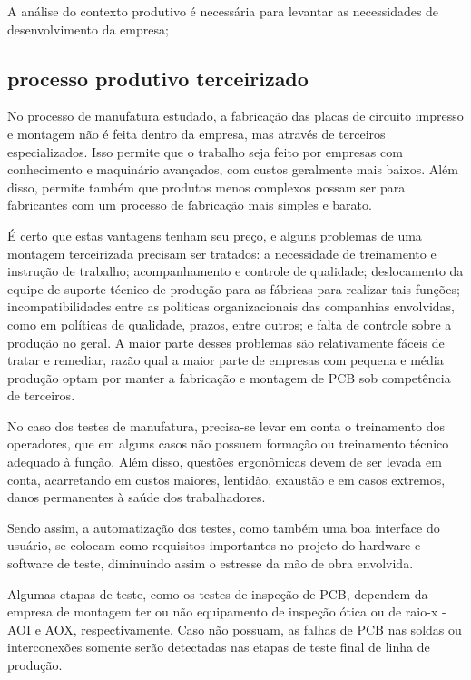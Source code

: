 
A análise do contexto produtivo é necessária para levantar as necessidades de desenvolvimento da empresa;

    \subsection{processo produtivo terceirizado}
        No processo de manufatura estudado, a fabricação das placas de circuito impresso e montagem não é feita dentro da empresa, mas através de terceiros especializados. Isso permite que o trabalho seja feito por empresas com conhecimento e maquinário avançados, com custos geralmente mais baixos. Além disso, permite também que produtos menos complexos possam ser para fabricantes com um processo de fabricação mais simples e barato.
        
        É certo que estas vantagens tenham seu preço, e alguns problemas de uma montagem terceirizada precisam ser tratados: a necessidade de treinamento e instrução de trabalho; acompanhamento e controle de qualidade; deslocamento da equipe de suporte técnico de produção para as fábricas para realizar tais funções; incompatibilidades entre as politicas organizacionais das companhias envolvidas, como em políticas de qualidade, prazos, entre outros; e falta de controle sobre a produção no geral. A maior parte desses problemas são relativamente fáceis de tratar e remediar, razão qual a maior parte de empresas com pequena e média produção optam por manter a fabricação e montagem de PCB sob competência de terceiros.
        
        No caso dos testes de manufatura, precisa-se levar em conta o treinamento dos operadores, que em alguns casos não possuem formação ou treinamento técnico adequado à função. Além disso, questões ergonômicas devem de ser levada em conta, acarretando em custos maiores, lentidão, exaustão e em casos extremos, danos permanentes à saúde dos trabalhadores. 
        
        Sendo assim, a automatização dos testes, como também uma boa interface do usuário, se colocam como requisitos importantes no projeto do hardware e software de teste, diminuindo assim o estresse da mão de obra envolvida. 
        
        Algumas etapas de teste, como os testes de inspeção de PCB, dependem da empresa de montagem ter ou não equipamento de inspeção ótica ou de raio-x - AOI e AOX, respectivamente. Caso não possuam, as falhas de PCB nas soldas ou interconexões somente serão detectadas nas etapas de teste final de linha de produção.
        
